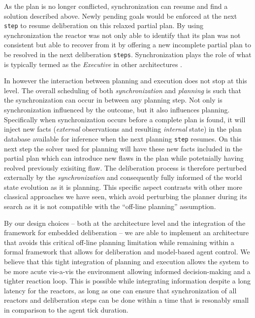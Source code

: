 As the plan is no longer conflicted, synchronization can resume and
find a solution described above. Newly pending goals would be enforced
at the next \texttt{step} to resume deliberation on this relaxed
partial plan. By using synchronization the reactor was not only able
to identify that its plan was not consistent but able to recover from
it by offering a new incomplete partial plan to be resolved in the
next deliberation \texttt{steps}. %
Synchronization plays the role of what is typically termed as the {\em
  Executive} in other architectures \cite{gat98, alami:1998p820,
  mus98, williams03, Nesnas:2003do}.

In \rx however the interaction between planning and execution does not
stop at this level. The overall scheduling of both {\em
  synchronization} and {\em planning} is such that the synchronization
can occur in between any planning step. Not only is synchronization
influenced by the outcome, but it also influences
planning. Specifically when synchronization occurs before a complete
plan is found, it will inject new facts ({\em external} observations
and resulting {\em internal} state) in the plan database available for
inference when the next planning \texttt{step} resumes. On this next
step the \eu solver used for planning will have these new facts
included in the partial plan which can introduce new flaws in the plan
while potetnially having reolved previously exisiting flaw. The
deliberation process is therefore perturbed externally by the {\em
  synchronization} and consequently fully informed of the world state
evolution as it is planning.  This specific aspect contrasts with
other more classical approaches we have seen, which avoid 
perturbing the planner during its search as it is not compatible 
with the ``off-line planning'' assumption.

By our design choices -- both at the architecture level and the
integration of the \eu framework for embedded deliberation -- we are
able to implement an architecture that avoids this critical off-line
planning limitation while remaining within a formal framework that
allows for deliberation and model-based agent control. We believe that
this tight integration of planning and execution allows the system to
be more acute vis-a-vis the environment allowing informed
decision-making and a tighter reaction loop. This is possible while
integrating information despite a long latency for the reactors, as
long as one can ensure that synchronization of all reactors and
deliberation steps can be done within a time that is resonably small
in comparison to the agent tick duration.








